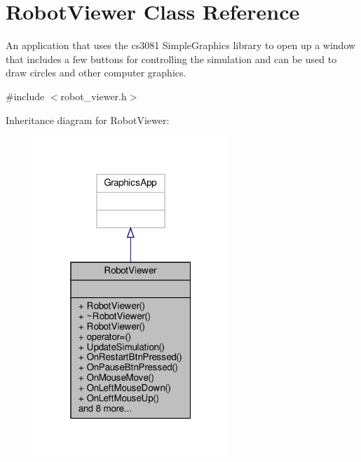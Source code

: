 \hypertarget{classRobotViewer}{}\section{Robot\+Viewer Class Reference}
\label{classRobotViewer}


An application that uses the cs3081 Simple\+Graphics library to open up a window that includes a few buttons for controlling the simulation and can be used to draw circles and other computer graphics.  




{\ttfamily \#include $<$robot\+\_\+viewer.\+h$>$}



Inheritance diagram for Robot\+Viewer\+:\nopagebreak
\begin{figure}[H]
\begin{center}
\leavevmode
\includegraphics[width=208pt]{classRobotViewer__inherit__graph}
\end{center}
\end{figure}


